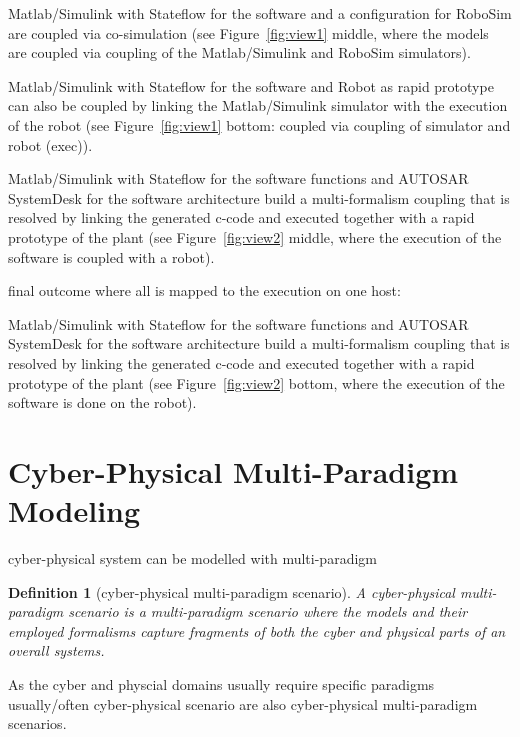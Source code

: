 \documentclass[a4paper,8pt]{article}
\newtheorem{definition}{\bf Definition}
\begin{document}
Matlab/Simulink with Stateflow for the software and a configuration for RoboSim are coupled via co-simulation (see Figure~\ref{fig:view1} middle, where the models are coupled via coupling of the Matlab/Simulink and RoboSim simulators).


Matlab/Simulink with Stateflow for the software and Robot as rapid prototype can also be coupled by linking the Matlab/Simulink simulator with the execution of the robot (see Figure~\ref{fig:view1} bottom: coupled via coupling of simulator and robot (exec)).



Matlab/Simulink with Stateflow for the software functions and AUTOSAR SystemDesk for the software architecture build a multi-formalism coupling that is resolved by linking the generated c-code and executed together with a rapid prototype of the plant (see Figure~\ref{fig:view2} middle, where the execution of the software is coupled with a robot).


final outcome where all is mapped to the execution on one host:

Matlab/Simulink with Stateflow for the software functions and AUTOSAR SystemDesk for the software architecture build a multi-formalism coupling that is resolved by linking the generated c-code and executed together with a rapid prototype of the plant (see Figure~\ref{fig:view2} bottom, where the execution of the software is done on the robot).



\section{Cyber-Physical Multi-Paradigm Modeling}

cyber-physical system can be modelled with multi-paradigm


\begin{definition}[cyber-physical multi-paradigm scenario]
A \emph{cyber-physical multi-paradigm scenario} is a multi-paradigm scenario where the models and their employed formalisms capture fragments of both the cyber and  physical parts of an overall systems. 
\end{definition}

As the cyber and physcial domains usually require specific paradigms usually/often cyber-physical scenario are also cyber-physical multi-paradigm scenarios.
\end{document}
